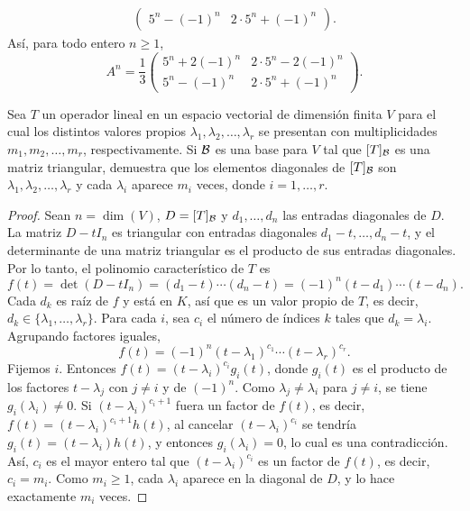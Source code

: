 \documentclass[12pt,a4paper]{article}
\begin{document}
\begin{solucion}
\begin{align*}
\begin{pmatrix}
                5^{n}-(-1)^{n} & 2\cdot5^{n}+(-1)^{n}
            \end{pmatrix}.
        \end{align*}
        Así, para todo entero $n\geq1$,
        \begin{equation*}
            A^{n}=\frac{1}{3}
            \begin{pmatrix}
                5^{n}+2(-1)^{n} & 2\cdot5^{n}-2(-1)^{n}\\
                5^{n}-(-1)^{n} & 2\cdot5^{n}+(-1)^{n}
            \end{pmatrix}.
        \end{equation*}
    \end{solucion}

    \begin{problema}
        Sea $T$ un operador lineal en un espacio vectorial de dimensión finita $V$ para el cual los distintos valores propios $\lambda_{1},\lambda_{2},\dots,\lambda_{r}$ se presentan con multiplicidades $m_{1},m_{2},\dots,m_{r}$, respectivamente. Si $\mathcal{B}$ es una base para $V$ tal que $[T]_{\mathcal{B}}$ es una matriz triangular, demuestra que los elementos diagonales de $[T]_{\mathcal{B}}$ son $\lambda_{1},\lambda_{2},\dots,\lambda_{r}$ y cada $\lambda_{i}$ aparece $m_{i}$ veces, donde $i=1,\dots,r$.
    \end{problema}

    \begin{proof}
        Sean $n=\dim(V)$, $D=[T]_{\mathcal{B}}$ y $d_{1},\dots,d_{n}$ las entradas diagonales de $D$. La matriz $D-tI_{n}$ es triangular con entradas diagonales $d_{1}-t,\dots,d_{n}-t$, y el determinante de una matriz triangular es el producto de sus entradas diagonales. Por lo tanto, el polinomio característico de $T$ es
        \begin{equation*}
            f(t)=\det(D-tI_{n})=(d_{1}-t)\cdots(d_{n}-t)=(-1)^{n}(t-d_{1})\cdots(t-d_{n}).
        \end{equation*}
        Cada $d_{k}$ es raíz de $f$ y está en $K$, así que es un valor propio de $T$, es decir, $d_{k}\in\{\lambda_{1},\dots,\lambda_{r}\}$. Para cada $i$, sea $c_{i}$ el número de índices $k$ tales que $d_{k}=\lambda_{i}$. Agrupando factores iguales,
        \begin{equation*}
            f(t)=(-1)^{n}(t-\lambda_{1})^{c_{1}}\cdots(t-\lambda_{r})^{c_{r}}.
        \end{equation*}
        Fijemos $i$. Entonces $f(t)=(t-\lambda_{i})^{c_{i}}g_{i}(t)$, donde $g_{i}(t)$ es el producto de los factores $t-\lambda_{j}$ con $j\neq i$ y de $(-1)^{n}$. Como $\lambda_{j}\neq\lambda_{i}$ para $j\neq i$, se tiene $g_{i}(\lambda_{i})\neq0$. Si $(t-\lambda_{i})^{c_{i}+1}$ fuera un factor de $f(t)$, es decir, $f(t)=(t-\lambda_{i})^{c_{i}+1}h(t)$, al cancelar $(t-\lambda_{i})^{c_{i}}$ se tendría $g_{i}(t)=(t-\lambda_{i})h(t)$, y entonces $g_{i}(\lambda_{i})=0$, lo cual es una contradicción. Así, $c_{i}$ es el mayor entero tal que $(t-\lambda_{i})^{c_{i}}$ es un factor de $f(t)$, es decir, $c_{i}=m_{i}$. Como $m_{i}\geq1$, cada $\lambda_{i}$ aparece en la diagonal de $D$, y lo hace exactamente $m_{i}$ veces.
    \end{proof}
\end{document}
